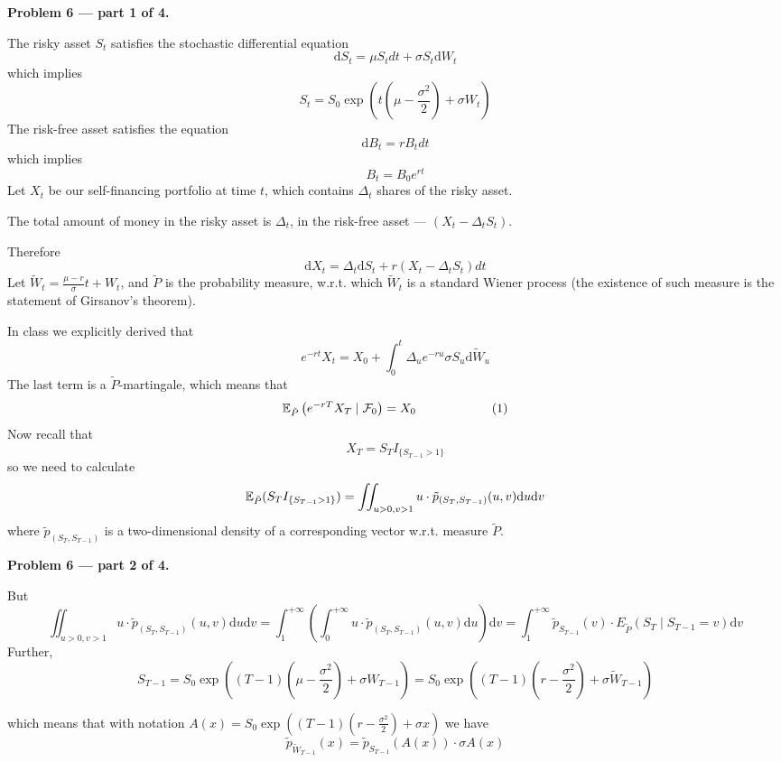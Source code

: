 \documentclass[12pt, a4paper]{article}
\newcommand{\cF}{\mathcal{F}}
\newcommand{\dt}{dt}
\newcommand{\du}{\mathrm{d}u}
\newcommand{\dv}{\mathrm{d}v}
\begin{document}
\textbf{Problem 6 — part 1 of 4.}\par
The risky asset $S_{t}$ satisfies the stochastic differential equation 
\[
  \mathrm{d}S_{t} = \mu S_{t}\dt + \sigma S_{t}\mathrm{d}W_{t}
\]
which implies
\[
S_{t} = S_{0}\exp \left(t\left(\mu - \frac{ \sigma^{2}}{ 2}\right) + \sigma W_{t}\right)
\]
The risk-free asset satisfies the equation
\[
\mathrm{d}B_{t} = rB_{t}\dt
\]
which implies
\[
B_{t} = B_{0}e^{rt}
\]
Let $X_{t}$ be our self-financing portfolio at time $t$, which contains $\Delta_{t}$ shares of the risky asset.\par
The total amount of money in the risky asset is $\Delta_{t}$, in the risk-free asset — $(X_{t} - \Delta_{t}S_{t})$.\par
Therefore
\[
\mathrm{d}X_{t} = \Delta_{t}\mathrm{d}S_{t} + r(X_{t} - \Delta_{t}S_{t})\dt
\]
Let $\tilde{W}_{t} = \frac{ \mu - r}{ \sigma}t + W_{t}$, and $\tilde{P}$ is the probability measure, w.r.t. which $\tilde{W}_{t}$ is a standard Wiener process (the existence of such measure is the statement of Girsanov's theorem).\par
In class we explicitly derived that
\[
e^{-rt}X_{t} = X_0 + \int_0^{t}\Delta_{u}e^{-ru}\sigma S_{u}\mathrm{d}\tilde{W}_{u}
\]
The last term is a $\tilde{P}$-martingale, which means that
\[
\E_{\tilde{P}}\left( e^{-rT}X_{T} \mid \cF_{0}\right) = X_0 \qquad\qquad\qquad (1)
\]
Now recall that
\[
X_{T} = S_{T}I_{\{S_{T-1} > 1\}}
\]
so we need to calculate
\[
\E_{\tilde{P}}(S_{T}I_{\{S_{T-1} > 1\}}) = \iint_{u > 0, v > 1}u\cdot \tilde{p}_{(S_{T}, S_{T-1})}(u,v)\du\dv
\]
where $\tilde{p}_{(S_{T}, S_{T-1})}$ is a two-dimensional density of a corresponding vector w.r.t. measure $\tilde{P}$.






\textbf{Problem 6 — part 2 of 4.}\par
But
\[
\iint_{u > 0, v > 1}u\cdot \tilde{p}_{(S_{T}, S_{T-1})}(u,v)\du\dv = \int_1^{+\infty}\left(\int_0^{+\infty}u\cdot \tilde{p}_{(S_{T}, S_{T-1})}(u,v) \du\right)\dv = \int_1^{+\infty}\tilde{p}_{S_{T-1}}(v)\cdot E_{\tilde{P}}\left(S_{T} \mid S_{T-1} = v\right)\dv
\]
Further,
\[
S_{T-1} = S_{0}\exp \left((T-1)\left(\mu - \frac{ \sigma^{2}}{ 2}\right) + \sigma W_{T-1}\right) = S_{0}\exp \left((T-1)\left(r - \frac{ \sigma^{2}}{ 2}\right) + \sigma \tilde{W}_{T-1}\right)
\]

which means that with notation $A(x) = S_{0}\exp \left((T-1)\left(r - \frac{ \sigma^{2}}{ 2}\right) + \sigma x\right)$ we have
\[
\tilde{p}_{\tilde{W}_{T-1}}(x) = \tilde{p}_{S_{T-1}}\left(A(x)\right)\cdot \sigma A(x)
\]
\end{document}
